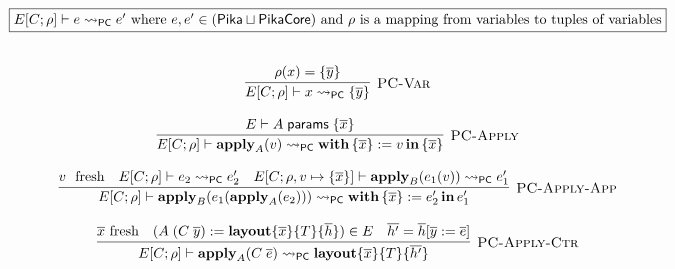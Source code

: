 \[
  \begin{array}{c}
    \fbox{$E[C;\rho] \vdash e \pcNotionStep e'\textrm{ where $e, e' \in (\Pika \sqcup \PikaCore)$ and $\rho$ is a mapping from variables to tuples of variables}$}
    \fboxNewlines
    \labinfer[PC-Var]{E[C;\rho] \vdash x \pcNotionStep \{\overline{y}\}}
      {\rho(x) = \{\overline{y}\}}
    \\\\
    \labinfer[PC-Apply]{E[C;\rho] \vdash \apply_A(v) \pcNotionStep \withIn{ \{ \overline{x} \} := v}{\{ \overline{x} \}}}
      {E \vdash A\; \layoutParams\; \{\overline{x}\}
      }
    \\\\
    \labinfer[PC-Apply-App]{E[C;\rho] \vdash \apply_B(e_1(\apply_A(e_2))) \pcNotionStep \withIn{\{ \overline{x} \} := e_2'}{e_1'} }
      {v\fresh
      &E[C;\rho] \vdash e_2 \pcNotionStep e_2'
      &E[C;\rho,v\mapsto\{\overline{x}\}] \vdash \apply_B(e_1(v)) \pcNotionStep e_1'
      }
    \\\\
    \labinfer[PC-Apply-Ctr]{E[C;\rho] \vdash \apply_A(C\; \overline{e}) \pcNotionStep \sslmath{\overline{x}}{T}{\overline{h'}}}
      {\fresh{\overline{x}}
      & (A\; (C\; \overline{y}) := \sslmath{\overline{x}}{T}{\overline{h}}) \in E
      & \overline{h'} = \overline{h}[\overline{y} := \overline{e}]
      }


\end{array}\]
